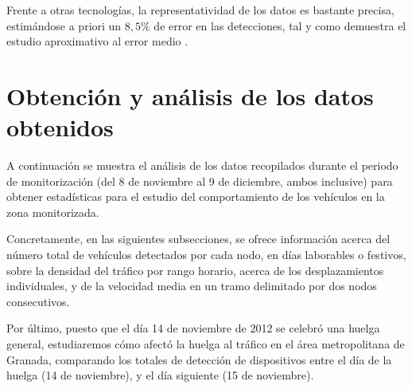 \documentclass[twocolumn,twoside]{Jornadas}
\begin{document}



Frente a otras tecnologías, la representatividad de los datos es bastante precisa, estimándose a priori un $8,5\%$ de error en las detecciones, tal y como demuestra el estudio aproximativo al error medio \cite{estudioprecision}.


\section{Obtención y análisis de los datos obtenidos}
\label{analisis}

A continuación se muestra el análisis de los datos recopilados durante el periodo de monitorización (del 8 de noviembre al 9 de diciembre, ambos inclusive) para obtener estadísticas 
para el estudio del comportamiento de los vehículos en la zona
monitorizada. %

Concretamente, en las siguientes subsecciones, se ofrece información acerca del número total de vehículos detectados por cada nodo, en días laborables o festivos, sobre la densidad del tráfico por rango horario, acerca de los desplazamientos individuales, y de la velocidad media en un tramo delimitado por dos nodos consecutivos.

Por último, puesto que el día 14 de noviembre de 2012 se celebró una huelga general, estudiaremos cómo afectó la huelga al tráfico en el área metropolitana de Granada, comparando los totales de detección de dispositivos entre el día de la huelga (14 de noviembre), y el día siguiente (15 de noviembre).
\end{document}
